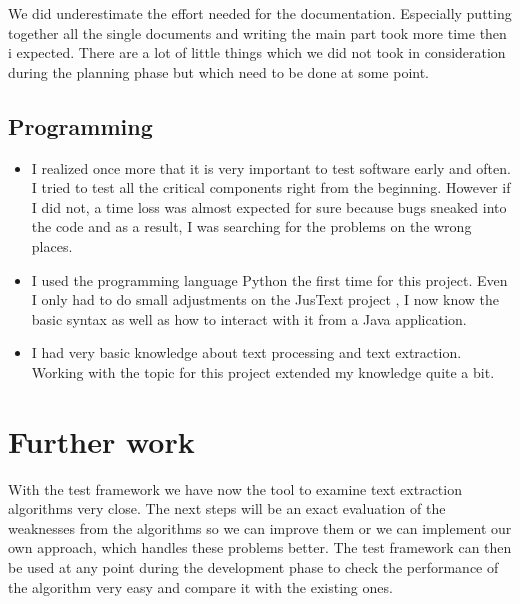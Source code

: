 We did underestimate the effort needed for the documentation. Especially putting together all the single documents and writing the main part took more time then i expected. There are a lot of little things which we did not took in consideration during the planning phase but which need to be done at some point.

\subsection{Programming}
\begin{itemize}
\item I realized once more that it is very important to test software early and often. I tried to test all the critical components right from the beginning. However if I did not, a time loss was almost expected for sure because bugs sneaked into the code and as a result, I was searching for the problems on the wrong places. 

\item I used the programming language Python the first time for this project. Even I only had to do small adjustments on the JusText project , I now know the basic syntax as well as how to interact with it from a Java application.

\item I had very basic knowledge about text processing and text extraction. Working with the topic for this project extended my knowledge quite a bit.


\end{itemize}

\section{Further work}

With the test framework we have now the tool to examine text extraction algorithms very close. The next steps will be an exact evaluation of the weaknesses from the algorithms so we can improve them or we can implement our own approach, which handles these problems better. The test framework can then be used at any point during the development phase to check the performance of the algorithm very easy and compare it with the existing ones.  


